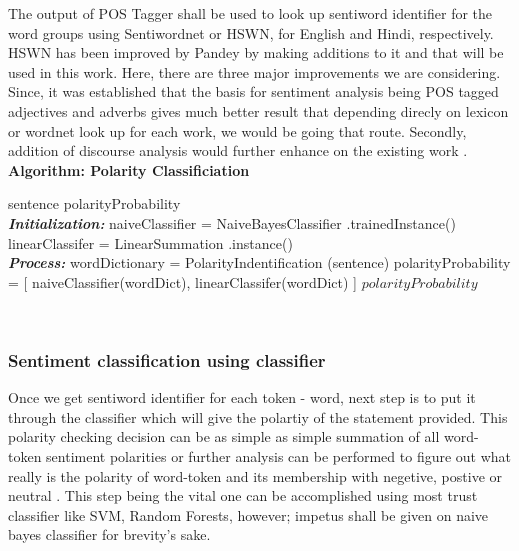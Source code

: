 \documentclass[conference]{IEEEtran}
\begin{document}
The output of POS Tagger shall be used to look up sentiword identifier for the
word groups using Sentiwordnet or HSWN, for English and Hindi, respectively.
HSWN has been improved by Pandey \cite{pandey_framework_2015} by making
additions to it and that will be used in this work. Here, there are three major
improvements we are considering. Since, it was established
\cite{shashank_sharma_sentiment_????} that the basis for sentiment analysis
being POS tagged adjectives and adverbs gives much better result that depending
direcly on lexicon or wordnet look up for each work, we would be going that
route. Secondly, addition of discourse analysis would further enhance on the
existing work \cite{shashank_sharma_sentiment_????}.
\\
\hline
\textbf{Algorithm: Polarity Classificiation}
\hline
\begin{algorithmic}[1]
 \renewcommand{\algorithmicrequire}{\textbf{Input:}}
 \renewcommand{\algorithmicensure}{\textbf{Output:}}
 \REQUIRE sentence
 \ENSURE  polarityProbability
 \\ \textbf{\textit{Initialization:}}
 \STATE naiveClassifier = NaiveBayesClassifier .trainedInstance()
 \STATE linearClassifer = LinearSummation .instance()
 \\ \textbf{\textit{Process:}}
 \STATE wordDictionary = PolarityIndentification (sentence)
 \STATE polarityProbability = [ naiveClassifier(wordDict), linearClassifer(wordDict) ]
 \RETURN $polarityProbability$
\end{algorithmic} 
\hline
\\

\subsubsection{Sentiment classification using classifier}
Once we get sentiword identifier for each token - word, next step is to put it
through the classifier which will give the polartiy of the statement provided.
This polarity checking decision can be as simple as simple summation of all
word-token sentiment polarities or further analysis can be performed to figure
out what really is the polarity of word-token and its membership with negetive,
postive or neutral . This step being the vital one can be accomplished using
most trust classifier like SVM, Random Forests, however; impetus shall be given
on naive bayes classifier for brevity's sake. \\
\end{document}

